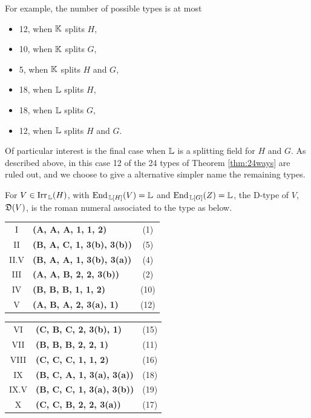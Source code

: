 For example, the number of possible types is at most
\begin{itemize}
    \item 12, when ${\mathbb K}$ splits $H$,
    \item 10, when ${\mathbb K}$ splits $G$,
    \item 5, when ${\mathbb K}$ splits $H$ and $G$,
    \item 18, when ${\mathbb L}$ splits $H$,
    \item 18, when ${\mathbb L}$ splits $G$,
    \item 12, when ${\mathbb L}$ splits $H$ and $G$.
\end{itemize}

Of particular interest is the final case when ${\mathbb L}$ is a splitting field for $H$ and $G$. As described above, in this case 12 of the 24 types of Theorem \ref{thm:24ways} are ruled out, and we choose to give a alternative simpler name the remaining types.

\begin{defn}\label{def:twelvetypes}
For $V \in \operatorname{Irr}_{\, {\mathbb L}}(H)$, with $\operatorname{End}_{\, {\mathbb L}[H]}(V) = {\mathbb L}$ and $\operatorname{End}_{\, {\mathbb L}[G]}(Z) = {\mathbb L}$, the D-type of $V$, ${\mathfrak D}(V)$, is the roman numeral associated to the type as below. \vspace{0.5em}

\begin{minipage}[t]{0.48\textwidth}  %
\begin{tabular}{c l c}
I & \textbf{(A, A, A, 1, 1, 2)} & (1) \\
II & \textbf{(B, A, C, 1, 3(b), 3(b))} & (5) \\
II.V & \textbf{(B, A, A, 1, 3(b), 3(a))} & (4) \\
III & \textbf{(A, A, B, 2, 2, 3(b))} & (2) \\
IV & \textbf{(B, B, B, 1, 1, 2)} & (10) \\
V & \textbf{(A, B, A, 2, 3(a), 1)} & (12) \\
\end{tabular}
\end{minipage}%
\hfill
\begin{minipage}[t]{0.48\textwidth}  %
\begin{tabular}{c l c}
VI & \textbf{(C, B, C, 2, 3(b), 1)} & (15) \\
VII & \textbf{(B, B, B, 2, 2, 1)} & (11) \\
VIII & \textbf{(C, C, C, 1, 1, 2)} & (16) \\
IX & \textbf{(B, C, A, 1, 3(a), 3(a))} & (18)\\
IX.V & \textbf{(B, C, C, 1, 3(a), 3(b))} & (19)\\
X & \textbf{(C, C, B, 2, 2, 3(a))} & (17) \\
\end{tabular}
\end{minipage}
\end{defn}

